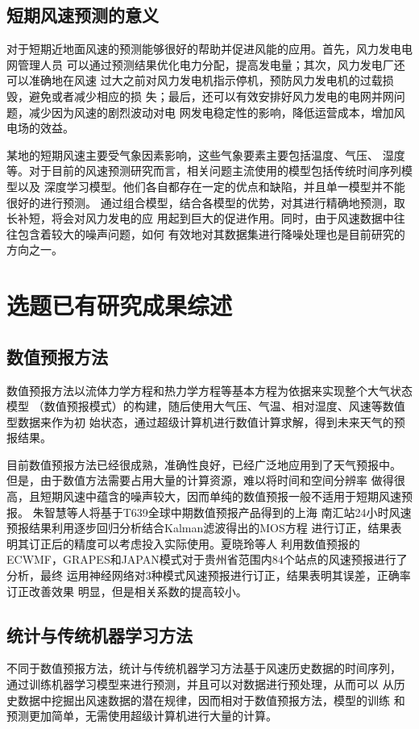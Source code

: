 \documentclass[AutoFakeBold]{LZUThesis}
\begin{document}
\subsection{短期风速预测的意义}
对于短期近地面风速的预测能够很好的帮助并促进风能的应用。首先，风力发电电网管理人员
可以通过预测结果优化电力分配，提高发电量；其次，风力发电厂还可以准确地在风速
过大之前对风力发电机指示停机，预防风力发电机的过载损毁，避免或者减少相应的损
失；最后，还可以有效安排好风力发电的电网并网问题，减少因为风速的剧烈波动对电
网发电稳定性的影响，降低运营成本，增加风电场的效益。

某地的短期风速主要受气象因素影响，这些气象要素主要包括温度、气压、
湿度等。对于目前的风速预测研究而言，相关问题主流使用的模型包括传统时间序列模型以及
深度学习模型。他们各自都存在一定的优点和缺陷，并且单一模型并不能很好的进行预测。
通过组合模型，结合各模型的优势，对其进行精确地预测，取长补短，将会对风力发电的应
用起到巨大的促进作用。同时，由于风速数据中往往包含着较大的噪声问题，如何
有效地对其数据集进行降噪处理也是目前研究的方向之一。

\section{选题已有研究成果综述}
\subsection{数值预报方法}
数值预报方法以流体力学方程和热力学方程等基本方程为依据来实现整个大气状态模型
（数值预报模式）的构建，随后使用大气压、气温、相对湿度、风速等数值型数据来作为初
始状态，通过超级计算机进行数值计算求解，得到未来天气的预报结果。

目前数值预报方法已经很成熟，准确性良好，已经广泛地应用到了天气预报中。
但是，由于数值方法需要占用大量的计算资源，难以将时间和空间分辨率
做得很高，且短期风速中蕴含的噪声较大，因而单纯的数值预报一般不适用于短期风速预报。
朱智慧等人将基于T639全球中期数值预报产品得到的上海
南汇站24小时风速预报结果利用逐步回归分析结合Kalman滤波得出的MOS方程
进行订正，结果表明其订正后的精度可以考虑投入实际使用。夏晓玲等人
利用数值预报的
ECWMF，GRAPES和JAPAN模式对于贵州省范围内84个站点的风速预报进行了分析，最终
运用神经网络对3种模式风速预报进行订正，结果表明其误差，正确率订正改善效果
明显，但是相关系数的提高较小。

\subsection{统计与传统机器学习方法}
不同于数值预报方法，统计与传统机器学习方法基于风速历史数据的时间序列，
通过训练机器学习模型来进行预测，并且可以对数据进行预处理，从而可以
从历史数据中挖掘出风速数据的潜在规律，因而相对于数值预报方法，模型的训练
和预测更加简单，无需使用超级计算机进行大量的计算。
\end{document}
